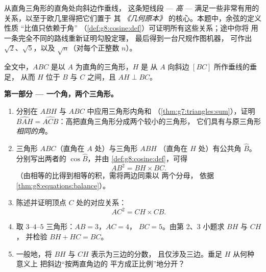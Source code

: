 \begin{problem}[{周末问题 --- 直角三角形的高：
$AB^2 = BH \times BC$，$AH^2 = BH \times HC$，勾股定理的第二种证明，
以及开平方根的机器}]
\label{pb:g8:cosine:1}
从直角三角形的直角处向斜边作垂线，
这条短线段 --- \emph{高} ---
满足一些非常有用的关系，以至于欧几里得把它们置于
其 \emph{《几何原本》} 的核心。本题中，余弦的定义性质
“比值只依赖于角”
（\cref{def:g8:cosine:def}）可证明所有这些关系；途中你将
用一条完全不同的路线重新证明勾股定理，
最后得到一台尺规作图机器，
可作出 $\sqrt2$、$\sqrt5$，以及 $\sqrt{n}$（对每个正整数 $n$）。

全文中，$ABC$ 是以 $A$ 为直角的三角形，$H$ 是
从 $A$ 向斜边 $[BC]$ 所作垂线的垂足，
从而 $H$ 位于 $B$ 与 $C$ 之间，且 $AH \perp BC$。

\medskip
\noindent\textbf{第一部分 --- 一个角，两个三角形。}
\begin{enumerate}
  \item 分别在 $ABH$ 与 $ABC$ 中应用三角形内角和
        （\cref{thm:g7:triangles:sum}），证明
        $\widehat{BAH} = \widehat{ACB}$：高把直角三角形分成两个较小的三角形，
        它们具有与原三角形
        \emph{相同的角}。
  \item 三角形 $ABC$（直角在 $A$ 处）与三角形 $ABH$
        （直角在 $H$ 处）有公共角 $\widehat B$。分别写出两者的
        $\cos\widehat B$，并由
        \cref{def:g8:cosine:def}，可得
        \[
        AB^2 = BH \times BC .
        \]
        （由相等的比得到相等的积，需将两边同乘以
        两个分母，
        依据\cref{thm:g8:equations:balance}）。
  \item 陈述并证明顶点 $C$ 处的对应关系：
        \[
        AC^2 = CH \times CB .
        \]
  \item 取 $3$--$4$--$5$ 三角形：$AB = 3$，$AC = 4$，
        $BC = 5$。由第 2、3 小题求 $BH$ 与 $CH$，
        并检验 $BH + HC = BC$。
  \item 一般地，将 $BH$ 与 $CH$ 表示为三边的分数，
        且仅涉及三边。垂足 $H$ 从何种意义上
        把斜边“按两直角边的
        平方成正比例”地分开？
\end{enumerate}


\end{problem}
